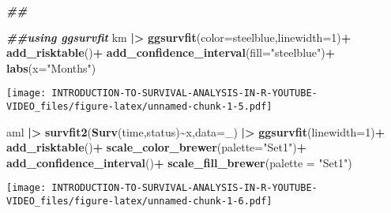 \documentclass[
]{article}
\newenvironment{Shaded}{\begin{snugshade}}{\end{snugshade}}
\newcommand{\AttributeTok}[1]{\textcolor[rgb]{0.13,0.29,0.53}{#1}}
\newcommand{\DecValTok}[1]{\textcolor[rgb]{0.00,0.00,0.81}{#1}}
\newcommand{\DocumentationTok}[1]{\textcolor[rgb]{0.56,0.35,0.01}{\textbf{\textit{#1}}}}
\newcommand{\FunctionTok}[1]{\textcolor[rgb]{0.13,0.29,0.53}{\textbf{#1}}}
\newcommand{\NormalTok}[1]{#1}
\newcommand{\SpecialCharTok}[1]{\textcolor[rgb]{0.81,0.36,0.00}{\textbf{#1}}}
\newcommand{\StringTok}[1]{\textcolor[rgb]{0.31,0.60,0.02}{#1}}
\begin{document}
\begin{Shaded}
\begin{Highlighting}[]
\DocumentationTok{\#\#}







\DocumentationTok{\#\#using ggsurvfit}
\NormalTok{km }\SpecialCharTok{|\textgreater{}} 
  \FunctionTok{ggsurvfit}\NormalTok{(}\AttributeTok{color=}\StringTok{\textquotesingle{}steelblue\textquotesingle{}}\NormalTok{,}\AttributeTok{linewidth=}\DecValTok{1}\NormalTok{)}\SpecialCharTok{+}
  \FunctionTok{add\_risktable}\NormalTok{()}\SpecialCharTok{+}
  \FunctionTok{add\_confidence\_interval}\NormalTok{(}\AttributeTok{fill=}\StringTok{"steelblue"}\NormalTok{)}\SpecialCharTok{+}
  \FunctionTok{labs}\NormalTok{(}\AttributeTok{x=}\StringTok{"Months"}\NormalTok{)}
\end{Highlighting}
\end{Shaded}

\texttt{[image: INTRODUCTION-TO-SURVIVAL-ANALYSIS-IN-R-YOUTUBE-VIDEO\_files/figure-latex/unnamed-chunk-1-5.pdf]}

\begin{Shaded}
\begin{Highlighting}[]
\NormalTok{aml }\SpecialCharTok{|\textgreater{}} 
\FunctionTok{survfit2}\NormalTok{(}\FunctionTok{Surv}\NormalTok{(time,status)}\SpecialCharTok{\textasciitilde{}}\NormalTok{x,}\AttributeTok{data=}\NormalTok{\_) }\SpecialCharTok{|\textgreater{}} 
  \FunctionTok{ggsurvfit}\NormalTok{(}\AttributeTok{linewidth=}\DecValTok{1}\NormalTok{)}\SpecialCharTok{+}
  \FunctionTok{add\_risktable}\NormalTok{()}\SpecialCharTok{+}
  \FunctionTok{scale\_color\_brewer}\NormalTok{(}\AttributeTok{palette=}\StringTok{"Set1"}\NormalTok{)}\SpecialCharTok{+}
  \FunctionTok{add\_confidence\_interval}\NormalTok{()}\SpecialCharTok{+}
  \FunctionTok{scale\_fill\_brewer}\NormalTok{(}\AttributeTok{palette =} \StringTok{"Set1"}\NormalTok{)}
\end{Highlighting}
\end{Shaded}

\texttt{[image: INTRODUCTION-TO-SURVIVAL-ANALYSIS-IN-R-YOUTUBE-VIDEO\_files/figure-latex/unnamed-chunk-1-6.pdf]}
\end{document}
